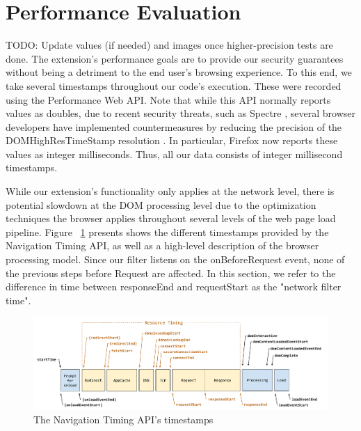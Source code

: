 \section{Performance Evaluation}
TODO: Update values (if needed) and images once higher-precision tests are done.
The extension's performance goals are to provide our security guarantees without being a detriment to the end user's browsing experience. To this end, we take several timestamps throughout our code's execution. These were recorded using the Performance Web API. Note that while this API normally reports values as doubles, due to recent security threats, such as Spectre \cite{DBLP:journals/corr/abs-1801-01203}, several browser developers have implemented countermeasures by reducing the precision of the DOMHighResTimeStamp resolution \cite{reducetimeprecision,resolutionconsiderations}. In particular, Firefox now reports these values as integer milliseconds. Thus, all our data consists of integer millisecond timestamps.

While our extension's functionality only applies at the network level, there is potential slowdown at the DOM processing level due to the optimization techniques the browser applies throughout several levels of the web page load pipeline. Figure ~\ref{fig:navigationtiming} presents shows the different timestamps provided by the Navigation Timing API, as well as a high-level description of the browser processing model. Since our filter listens on the onBeforeRequest event, none of the previous steps before Request are affected. In this section, we refer to the difference in time between responseEnd and requestStart as the "network filter time".

\begin{figure}[h]
 \includegraphics[scale=0.32]{img/timestamp-diagram}
 \caption{The Navigation Timing API's timestamps}
 \label{fig:navigationtiming}
 \end{figure}

